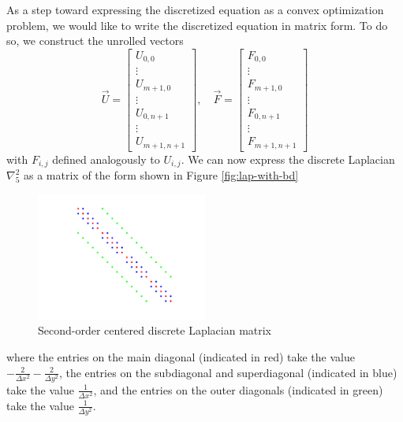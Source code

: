 \documentclass[conference]{IEEEtran}
\begin{document}
As a step toward expressing the discretized equation as a convex optimization problem, we would like to write the discretized equation in matrix form. To do so, we construct the unrolled vectors
\begin{equation}
  \vec{U} = \begin{bmatrix}
    U_{0,0} \\ \vdots \\ U_{m+1,0} \\ \vdots \\ U_{0,n+1} \\ \vdots \\ U_{m+1,n+1}
  \end{bmatrix}, \quad \vec{F} = \begin{bmatrix}
    F_{0,0} \\ \vdots \\ F_{m+1,0} \\ \vdots \\ F_{0,n+1} \\ \vdots \\ F_{m+1,n+1}
  \end{bmatrix}
\end{equation}
with $F_{i,j}$ defined analogously to $U_{i,j}$. We can now express the discrete Laplacian $\nabla_5^2$ as a matrix of the form shown in Figure \ref{fig:lap-with-bd}
\begin{figure}[t]
  \begin{center}
    \includegraphics[width=0.5\textwidth]{discrete-laplacian}
    \caption{Second-order centered discrete Laplacian matrix}
    \label{fig:discrete-laplacian}
  \end{center}
\end{figure}
where the entries on the main diagonal (indicated in red) take the value $-\frac{2}{\Delta x^2}-\frac{2}{\Delta y^2}$, the entries on the subdiagonal and superdiagonal (indicated in blue) take the value $\frac{1}{\Delta x^2}$, and the entries on the outer diagonals (indicated in green) take the value $\frac{1}{\Delta y^2}$.
\end{document}
